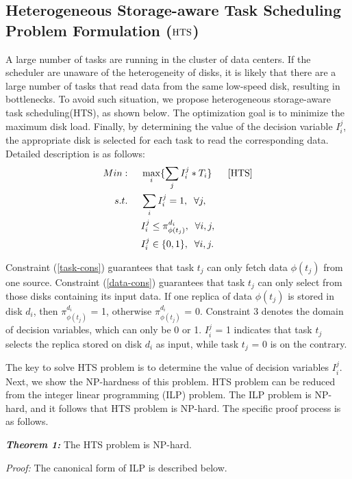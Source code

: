 \documentclass[conference]{IEEEtran}
\begin{document}
\subsection{Heterogeneous Storage-aware Task Scheduling Problem Formulation ($\rm{HTS}$)} \label{HTS}
A large number of tasks are running in the cluster of data centers. If the scheduler are unaware of the heterogeneity of disks, it is likely that there are a large number of tasks that read data from the same low-speed disk, resulting in bottlenecks. To avoid such situation, we propose heterogeneous storage-aware task scheduling(HTS), as shown below. The optimization goal is to minimize the maximum disk load. Finally, by determining the value of the decision variable $I_i^j$, the appropriate disk is selected for each task to read the corresponding data. Detailed description is as follows:
\begin{align}
Min:&\;\;\;\;\;\max\limits_{i}\{\sum_{j}I_i^j*T_i\}\;\;\;\;\;\;[\rm{HTS}]\nonumber\\
s.t. 
&\;\;\;\;\;\sum_{i}I_i^j = 1,\;\;\forall j,\label{task-cons}\\
&\;\;\;\;\;I_i^j \leq \pi_{\phi(t_j)}^{d_i},\;\;\forall i,j\label{data-cons},\\
&\;\;\;\;\;I_i^j\in\{0,1\},\;\;\forall i,j.\label{def-cons}
\end{align}

Constraint (\ref{task-cons}) guarantees that task $t_j$ can only fetch data $\phi(t_j)$ from one source. Constraint (\ref{data-cons}) guarantees that task $t_j$ can only select from those disks containing its input data. If one replica of data $\phi(t_j)$ is stored in disk $d_i$, then $\pi_{\phi(t_j)}^{d_i}$ = 1, otherwise $\pi_{\phi(t_j)}^{d_i}$ = 0. Constraint 3 denotes the domain of decision variables, which can only be 0 or 1. $I_i^j$ = 1 indicates that task $t_j$ selects the replica stored on disk $d_i$ as input, while task $t_j$ = 0 is on the contrary.

The key to solve HTS problem is to determine the value of decision variables {$I_i^j$}. Next, we show the NP-hardness of this problem. HTS problem can be reduced from the integer linear programming (ILP) problem. The ILP problem is NP-hard, and it follows that HTS problem is NP-hard. The specific proof process is as follows.

\emph{\textbf{Theorem 1:}} The HTS problem is NP-hard.

\emph{Proof:}
The canonical form \cite{b11} of ILP is described below.
\end{document}
